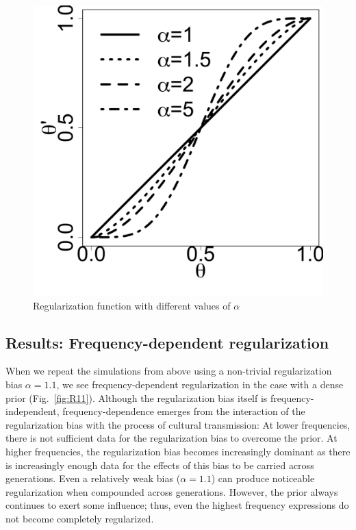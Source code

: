 \documentclass{evolang11}
\begin{document}
 \begin{figure}
\begin{center}
\includegraphics[scale=.2]{R.pdf}
\end{center}
\caption{{\footnotesize Regularization function with different values of $\alpha$ \label{fig:R}}}
\end{figure}

 \subsection{Results: Frequency-dependent regularization}
 When we repeat the simulations from above using  a non-trivial regularization bias $\alpha=1.1$, we see frequency-dependent regularization in the case with a dense prior (Fig.\ \ref{fig:R11}). Although the regularization bias itself is frequency-independent, frequency-dependence emerges from the interaction of the regularization bias with the process of cultural transmission: At lower frequencies, there is not sufficient data for the regularization bias to overcome the prior. At higher frequencies, the regularization bias becomes increasingly dominant as there is increasingly enough data for the effects of this bias to be carried across generations. Even a relatively weak bias ($\alpha=1.1$) can produce noticeable regularization when compounded across generations. However, the prior always continues to exert some influence; thus, even the highest frequency expressions do not become completely regularized.
 
\end{document}
